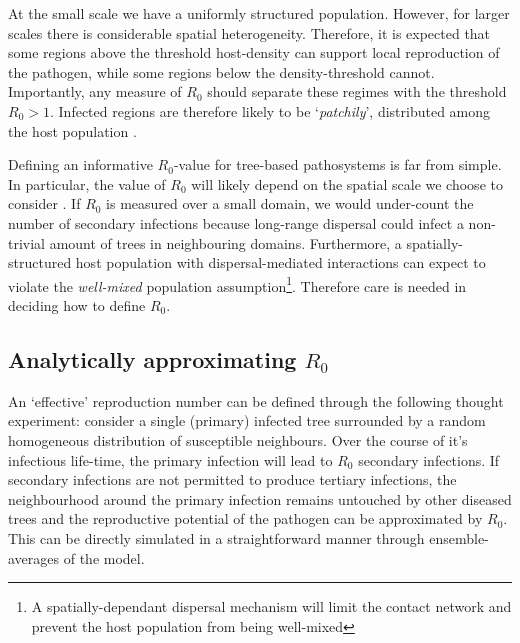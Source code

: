 At the small scale we have a uniformly structured population. %
However, for larger scales there is considerable spatial heterogeneity. %
Therefore, it is expected that some regions above the threshold host-density can support %
local reproduction of the pathogen, while some regions below the density-threshold cannot. %
Importantly, any measure of $R_0$ should separate these regimes with the threshold $R_0>1$. %
Infected regions are therefore likely to be `\textit{patchily}', distributed among the host %
population \cite{park2001invasion}.

Defining an informative $R_0$-value for tree-based pathosystems is far from simple. %
In particular, the value of $R_0$ will likely depend on the spatial scale we choose to %
consider \cite{mikaberidze2016invasiveness}. %
If  $R_0$ is measured over a small domain, we would under-count the number of secondary %
infections because long-range dispersal could infect a non-trivial amount of trees in %
neighbouring domains. %
Furthermore, a spatially-structured host population with dispersal-mediated interactions %
can expect to violate the \textit{well-mixed} population assumption\footnote{A spatially-dependant dispersal mechanism will limit the contact network and prevent the host population from being well-mixed}. 
Therefore care is needed in deciding how to define $R_0$.

\subsection{Analytically approximating $R_0$}

An `effective' reproduction number can be defined through the following thought experiment: consider a single (primary) infected tree surrounded by a random homogeneous distribution of susceptible neighbours. Over the course of it's infectious life-time, the primary infection will lead to $R_0$ secondary infections. If secondary infections are not permitted to produce tertiary infections, the neighbourhood around the primary infection remains untouched by other diseased trees and the reproductive potential of the pathogen can be approximated by $R_0$. This can be directly simulated in a straightforward manner through ensemble-averages of the model.\\

